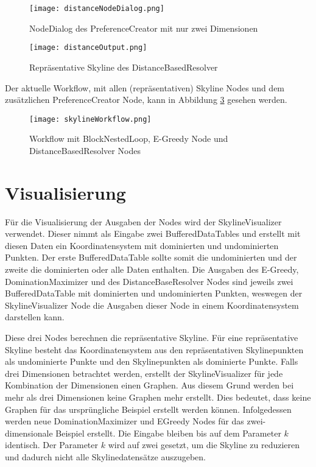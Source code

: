 \begin{figure}[H]
	\centering
	\texttt{[image: distanceNodeDialog.png]}
	\caption{NodeDialog des PreferenceCreator mit nur zwei Dimensionen}
	\label{img:distanceNodeDialog}
\end{figure} 

\begin{figure}[H]
	\centering
	\texttt{[image: distanceOutput.png]}
	\caption{Repräsentative Skyline des DistanceBasedResolver}
	\label{img:distanceOutput}
\end{figure} 

Der aktuelle Workflow, mit allen (repräsentativen) Skyline Nodes und dem zusätzlichen PreferenceCreator Node, kann in Abbildung \ref{img:skylineWorkflow} gesehen werden.

\begin{figure}[H]
	\centering
	\texttt{[image: skylineWorkflow.png]}
	\caption{Workflow mit BlockNestedLoop, E-Greedy Node und DistanceBasedResolver Nodes}
	\label{img:skylineWorkflow}
\end{figure} 
\section{Visualisierung}
\label{ch:Evaluierung:sec:visualize}
Für die Visualisierung der Ausgaben der Nodes wird der SkylineVisualizer verwendet. Dieser nimmt als Eingabe zwei BufferedDataTables und erstellt mit diesen Daten ein Koordinatensystem mit dominierten und undominierten Punkten. Der erste BufferedDataTable sollte somit die undominierten und der zweite die dominierten oder alle Daten enthalten. Die Ausgaben des E-Greedy, DominationMaximizer und des DistanceBaseResolver Nodes sind jeweils zwei BufferedDataTable mit dominierten und undominierten Punkten, weswegen der SkylineVisualizer Node die Ausgaben dieser Node in einem Koordinatensystem darstellen kann.

Diese drei Nodes berechnen die repräsentative Skyline. Für eine repräsentative Skyline besteht das Koordinatensystem aus den repräsentativen Skylinepunkten als undominierte Punkte und den Skylinepunkten als dominierte Punkte. Falls drei Dimensionen betrachtet werden, erstellt der SkylineVisualizer für jede Kombination der Dimensionen einen Graphen. Aus diesem Grund werden bei mehr als drei Dimensionen keine Graphen mehr erstellt. Dies bedeutet, dass keine Graphen für das ursprüngliche Beispiel erstellt werden können. Infolgedessen werden neue DominationMaximizer und EGreedy Nodes für das zwei-dimensionale Beispiel erstellt. Die Eingabe bleiben bis auf dem Parameter $k$ identisch. Der Parameter $k$ wird auf zwei gesetzt, um die Skyline zu reduzieren und dadurch nicht alle Skylinedatensätze auszugeben. 

